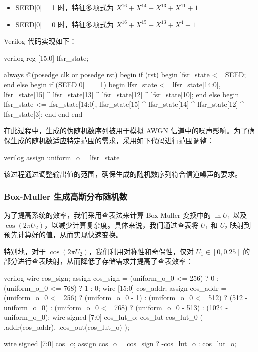 \documentclass[a4paper]{article}  %
\begin{document}
\begin{itemize} 
    \item SEED[0] = 1 时，特征多项式为 $X^{16} + X^{14} + X^{13} + X^{11} + 1$ 
    \item SEED[0] = 0 时，特征多项式为 $X^{16} + X^{15} + X^{13} + X^{4} + 1$ 
\end{itemize}

Verilog 代码实现如下：

\begin{codeblock}{verilog}
reg [15:0] lfsr_state;

always @(posedge clk or posedge rst) begin
    if (rst) begin
        lfsr_state <= SEED;
    end else begin
        if (SEED[0] == 1) begin
            lfsr_state <= {lfsr_state[14:0], lfsr_state[15] ^ lfsr_state[13] ^ lfsr_state[12] ^ lfsr_state[10]};
        end else begin
            lfsr_state <= {lfsr_state[14:0], lfsr_state[15] ^ lfsr_state[14] ^ lfsr_state[12] ^ lfsr_state[3]};
        end
    end
end
\end{codeblock}

在此过程中，生成的伪随机数序列被用于模拟 AWGN 信道中的噪声影响。为了确保生成的随机数适应特定范围的需求，采用如下代码进行范围调整：

\begin{codeblock}{verilog}
assign uniform_o = lfsr_state %
\end{codeblock}

该过程通过调整输出值的范围，确保生成的随机数序列符合信道噪声的要求。


\subsubsection{Box-Muller 生成高斯分布随机数}

为了提高系统的效率，我们采用查表法来计算 Box-Muller 变换中的 $\ln U_1$ 以及 $\cos(2 \pi U_2)$，以减少计算复杂度。具体来说，我们通过查表将 $U_1$ 和 $U_2$ 映射到预先计算好的值，从而实现快速变换。

特别地，对于 $\cos(2 \pi U_2)$，我们利用对称性和奇偶性，仅对 $U_1 \in [0, 0.25]$ 的部分进行查表映射，从而降低了存储需求并提高了查表效率：

\begin{codeblock}{verilog}
    wire cos_sign;
    assign cos_sign = (uniform_o_0 <= 256) ? 0 :
                      (uniform_o_0 <= 768) ? 1 :
                      0;
    wire [15:0] cos_addr;
    assign cos_addr = (uniform_o_0 <= 256) ? (uniform_o_0 - 1) :
                      (uniform_o_0 <= 512) ? (512 - uniform_o_0) :
                      (uniform_o_0 <= 768) ? (uniform_o_0 - 513) :
                      (1024 - uniform_o_0);
    wire signed [7:0] cos_lut_o;
    cos_lut cos_lut_0 (
        .addr(cos_addr),
        .cos_out(cos_lut_o)
    );

    wire signed [7:0] cos_o;
    assign cos_o = cos_sign ? -cos_lut_o : cos_lut_o;
\end{codeblock}
\end{document}
